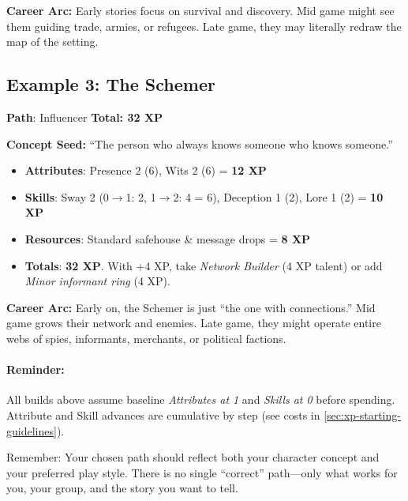 \noindent\textbf{Career Arc:} Early stories focus on survival and discovery. Mid
game might see them guiding trade, armies, or refugees. Late game, they may
literally redraw the map of the setting.

\subsection*{Example 3: The Schemer}
\label{sec:xp-ex-schemer}

\textbf{Path}: Influencer \quad \textbf{Total: 32 XP}

\medskip

\noindent\textbf{Concept Seed:} ``The person who always knows someone who knows someone.''

\begin{itemize}
\item \textbf{Attributes}: Presence 2 (6), Wits 2 (6) = \textbf{12 XP}
\item \textbf{Skills}: Sway 2 (0\(\to\)1: 2, 1\(\to\)2: 4 = 6), Deception 1 (2), Lore 1 (2) = \textbf{10 XP}
\item \textbf{Resources}: Standard safehouse \& message drops = \textbf{8 XP}
\item \textbf{Totals}: \textbf{32 XP}. With +4 XP, take \emph{Network Builder} (4 XP talent) or add \emph{Minor informant ring} (4 XP).
\end{itemize}

\noindent\textbf{Career Arc:} Early on, the Schemer is just ``the one with
connections.'' Mid game grows their network and enemies. Late game, they might
operate entire webs of spies, informants, merchants, or political factions.

\paragraph{Reminder:}
All builds above assume baseline \emph{Attributes at 1} and \emph{Skills at 0}
before spending. Attribute and Skill advances are cumulative by step (see costs
in \ref{sec:xp-starting-guidelines}).

Remember: Your chosen path should reflect both your character concept and your
preferred play style. There is no single ``correct'' path---only what works for
you, your group, and the story you want to tell.


